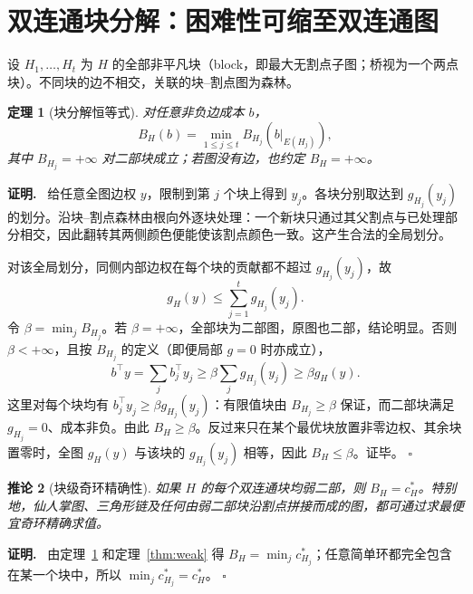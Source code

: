 \documentclass[11pt,a4paper]{ctexart}
\newtheorem{theorem}{定理}[section]
\newtheorem{corollary}[theorem]{推论}
\theoremstyle{definition}
\newenvironment{proofcn}{\par\noindent\textbf{证明.}\ }{\hfill$\square$\par}
\newcommand{\1}{\boldsymbol 1}
\begin{document}
\section{双连通块分解：困难性可缩至双连通图}
设 $H_1,\dots,H_t$ 为 $H$ 的全部非平凡块（block，即最大无割点子图；桥视为一个两点块）。不同块的边不相交，关联的块--割点图为森林。

\begin{theorem}[块分解恒等式]\label{thm:block}
对任意非负边成本 $b$，
\begin{equation}\label{eq:block}
 \boxed{B_H(b)=\min_{1\le j\le t}B_{H_j}(b|_{E(H_j)}),}
\end{equation}
其中 $B_{H_j}=+\infty$ 对二部块成立；若图没有边，也约定 $B_H=+\infty$。
\end{theorem}
\begin{proofcn}
给任意全图边权 $y$，限制到第 $j$ 个块上得到 $y_j$。各块分别取达到 $g_{H_j}(y_j)$ 的划分。沿块--割点森林由根向外逐块处理：一个新块只通过其父割点与已处理部分相交，因此翻转其两侧颜色便能使该割点颜色一致。这产生合法的全局划分。

对该全局划分，同侧内部边权在每个块的贡献都不超过 $g_{H_j}(y_j)$，故
\begin{equation}\label{eq:blockineq}
 g_H(y)\le\sum_{j=1}^{t}g_{H_j}(y_j).
\end{equation}
令 $\beta=\min_j B_{H_j}$。若 $\beta=+\infty$，全部块为二部图，原图也二部，结论明显。否则 $\beta<+\infty$，且按 $B_{H_j}$ 的定义（即便局部 $g=0$ 时亦成立），
\[
 b^\top y=\sum_j b_j^\top y_j
 \ge \beta\sum_j g_{H_j}(y_j)
 \ge\beta g_H(y).
\]
这里对每个块均有 $b_j^\top y_j\ge\beta g_{H_j}(y_j)$：有限值块由 $B_{H_j}\ge\beta$ 保证，而二部块满足 $g_{H_j}=0$、成本非负。由此 $B_H\ge\beta$。反过来只在某个最优块放置非零边权、其余块置零时，全图 $g_H(y)$ 与该块的 $g_{H_j}(y_j)$ 相等，因此 $B_H\le\beta$。证毕。
\end{proofcn}

\begin{corollary}[块级奇环精确性]
如果 $H$ 的每个双连通块均弱二部，则 $B_H=c_H^*$。特别地，仙人掌图、三角形链及任何由弱二部块沿割点拼接而成的图，都可通过求最便宜奇环精确求值。
\end{corollary}
\begin{proofcn}
由定理~\ref{thm:block} 和定理~\ref{thm:weak} 得 $B_H=\min_j c_{H_j}^*$；任意简单环都完全包含在某一个块中，所以 $\min_jc_{H_j}^*=c_H^*$。
\end{proofcn}
\end{document}
